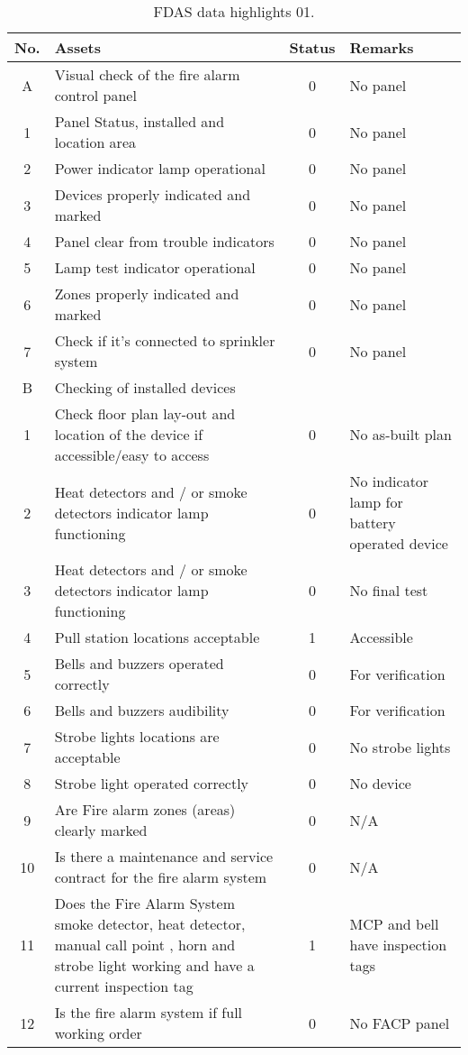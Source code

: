 \begin{table}[!h]
	\caption{FDAS data highlights 01.}
	\label{ch04_fdas01}
	{\scriptsize
\begin{tabular}{c|p{6.5cm}|c|p{5.5cm}}
	\hline
	No. & Assets & Status & Remarks \\ 
\hline
A & Visual check of the fire alarm control panel & 0 & No panel \\ 
1 & Panel Status, installed and location area & 0 & No panel \\ 
2 & Power indicator lamp operational & 0 & No panel \\ 
3 & Devices properly indicated and marked & 0 & No panel \\ 
4 & Panel clear from trouble indicators & 0 & No panel \\ 
5 & Lamp test indicator operational & 0 & No panel \\ 
6 & Zones properly indicated and marked & 0 & No panel \\ 
7 & Check if it’s connected to sprinkler system & 0 & No panel \\ 
\hline
B & Checking of installed devices &  &  \\ 
1 & Check floor plan lay-out and location of the device if accessible/easy to access & 0 & No as-built plan \\ 
2 & Heat detectors and / or smoke detectors indicator lamp functioning & 0 & No indicator lamp for battery operated device \\ 
3 & Heat detectors and / or smoke detectors indicator lamp functioning & 0 & No final test \\ 
4 & Pull station locations acceptable & 1 & Accessible \\ 
5 & Bells and buzzers operated correctly & 0 & For verification \\ 
6 & Bells and buzzers audibility & 0 & For verification \\ 
7 & Strobe lights locations are acceptable & 0 & No strobe lights \\ 
8 & Strobe light operated correctly & 0 & No device \\ 
9 & Are Fire alarm zones (areas) clearly marked & 0 & N/A \\ 
10 & Is there a maintenance and service contract for the fire alarm system & 0 & N/A \\ 
11 & Does the Fire Alarm System smoke detector, heat detector, manual call point , horn and strobe light working and  have a current inspection tag & 1 & MCP and bell have inspection tags \\ 
12 & Is the fire alarm system if full working order & 0 & No FACP panel \\ 
\hline
\end{tabular}

	}
\end{table}

